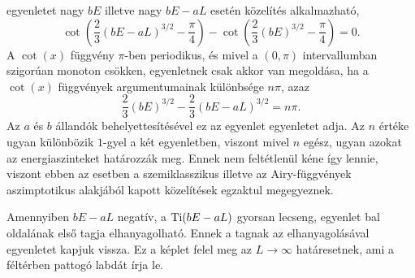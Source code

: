  egyenletet nagy $bE$ illetve nagy $bE-aL$ esetén  közelítés alkalmazható,
\begin{equation}
	\cot\left(\frac{2}{3}\left(bE-aL\right)^{3/2}-\frac{\pi}{4}\right)-\cot\left(\frac{2}{3}\left(bE\right)^{3/2}-\frac{\pi}{4}\right)=0.
	\label{quantumApprox:cot}
\end{equation}
A $\cot(x)$ függvény $\pi$-ben periodikus, és mivel a $(0,\pi)$ intervallumban szigorúan monoton csökken,  egyenletnek csak akkor van megoldása, ha a $\cot(x)$ függvények argumentumainak különbsége $n\pi$, azaz
\begin{equation}
	\frac{2}{3}\left(bE\right)^{3/2}-\frac{2}{3}\left(bE-aL\right)^{3/2}=n\pi.
\end{equation}
Az $a$ és $b$ állandók behelyettesítésével ez az egyenlet  egyenletet adja. Az $n$  értéke ugyan különbözik $1$-gyel a két egyenletben, viszont mivel $n$ egész, ugyan azokat az energiaszinteket határozzák meg. Ennek nem feltétlenül kéne így lennie, viszont ebben az esetben a szemiklasszikus illetve az Airy-függvények aszimptotikus alakjából kapott közelítések egzaktul megegyeznek.

Amennyiben $bE-aL$ negatív, a $\mathrm{Ti}(bE-aL)$ gyorsan lecseng,  egyenlet bal oldalának első tagja elhanyagolható. Ennek a tagnak az elhanyagolásával  egyenletet kapjuk vissza. Ez a képlet felel meg az $L\to\infty$ határesetnek, ami a féltérben pattogó labdát írja le.


